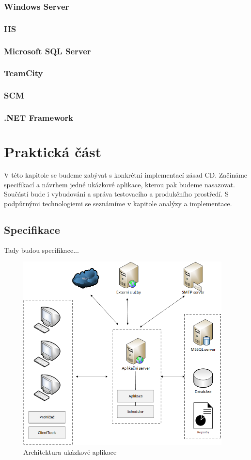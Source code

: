 \subsection{Windows Server}

\subsection{IIS}

\subsection{Microsoft SQL Server}

\subsection{TeamCity}

\subsection{SCM}

\subsection{.NET Framework}


\chapter{Praktická část}
\label{ch:impl}
V této kapitole se budeme zabývat s konkrétní implementací zásad CD. Začínáme specifikací a návrhem jedné ukázkové aplikace, kterou pak budeme nasazovat. Součástí bude i vybudování a správa testovacího a produkčního prostředí. S podpůrnými technologiemi se seznámíme v kapitole analýzy a implementace.

\section{Specifikace}
Tady budou specifikace...

\begin{figure}[]
  \centering
  \includegraphics[height=10cm]{fig/app_architektura.png}
  \caption{Architektura ukázkové aplikace}
  \label{fig:architektura}
\end{figure}

